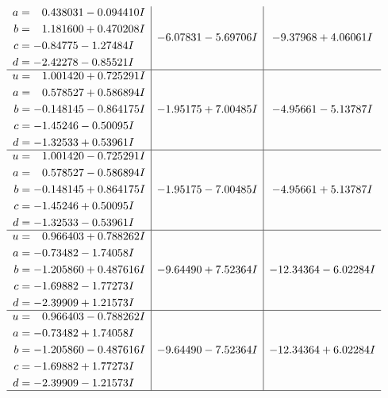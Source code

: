 \documentclass[1p]{elsarticle_modified}
\theoremstyle{definition}
\begin{document}
$$\begin{array}{c|c|c}
\begin{aligned}
a &= \phantom{-}0.438031 - 0.094410 I \\
b &= \phantom{-}1.181600 + 0.470208 I \\
c &= -0.84775 - 1.27484 I \\
d &= -2.42278 - 0.85521 I\end{aligned}
 & -6.07831 - 5.69706 I & -9.37968 + 4.06061 I \\ \hline\begin{aligned}
u &= \phantom{-}1.001420 + 0.725291 I \\
a &= \phantom{-}0.578527 + 0.586894 I \\
b &= -0.148145 - 0.864175 I \\
c &= -1.45246 - 0.50095 I \\
d &= -1.32533 + 0.53961 I\end{aligned}
 & -1.95175 + 7.00485 I & -4.95661 - 5.13787 I \\ \hline\begin{aligned}
u &= \phantom{-}1.001420 - 0.725291 I \\
a &= \phantom{-}0.578527 - 0.586894 I \\
b &= -0.148145 + 0.864175 I \\
c &= -1.45246 + 0.50095 I \\
d &= -1.32533 - 0.53961 I\end{aligned}
 & -1.95175 - 7.00485 I & -4.95661 + 5.13787 I \\ \hline\begin{aligned}
u &= \phantom{-}0.966403 + 0.788262 I \\
a &= -0.73482 - 1.74058 I \\
b &= -1.205860 + 0.487616 I \\
c &= -1.69882 - 1.77273 I \\
d &= -2.39909 + 1.21573 I\end{aligned}
 & -9.64490 + 7.52364 I & -12.34364 - 6.02284 I \\ \hline\begin{aligned}
u &= \phantom{-}0.966403 - 0.788262 I \\
a &= -0.73482 + 1.74058 I \\
b &= -1.205860 - 0.487616 I \\
c &= -1.69882 + 1.77273 I \\
d &= -2.39909 - 1.21573 I\end{aligned}
 & -9.64490 - 7.52364 I & -12.34364 + 6.02284 I\\
 \hline 
 \end{array}$$\newpage$$\begin{array}{c|c|c}  

\end{array}$$
\end{document}
